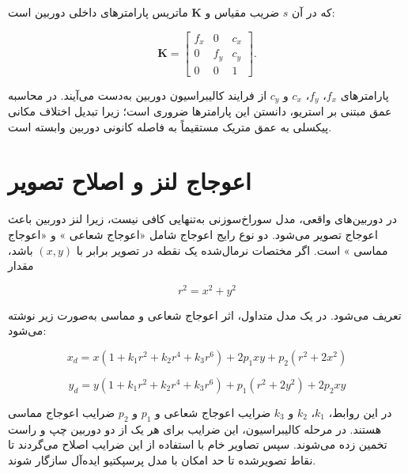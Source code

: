 که در آن \(s\) ضریب مقیاس و \(\mathbf{K}\) ماتریس پارامترهای داخلی دوربین است:

\begin{equation}
	\mathbf{K} =
	\begin{bmatrix}
		f_x & 0 & c_x \\
		0 & f_y & c_y \\
		0 & 0 & 1
	\end{bmatrix}.
	\label{eq:camera_intrinsic_matrix}
\end{equation}

پارامترهای \(f_x\)، \(f_y\)، \(c_x\) و \(c_y\) از فرایند کالیبراسیون دوربین به‌دست می‌آیند. در محاسبه عمق مبتنی بر استریو، دانستن این پارامترها ضروری است؛ زیرا تبدیل اختلاف مکانی پیکسلی به عمق متریک مستقیماً به فاصله کانونی دوربین وابسته است.

\section{اعوجاج لنز و اصلاح تصویر}

در دوربین‌های واقعی، مدل سوراخ‌سوزنی به‌تنهایی کافی نیست، زیرا لنز دوربین باعث اعوجاج تصویر می‌شود. دو نوع رایج اعوجاج شامل «اعوجاج شعاعی%
» %
و «اعوجاج مماسی%
» %
است. اگر مختصات نرمال‌شده یک نقطه در تصویر برابر با \((x,y)\) باشد، مقدار

\begin{equation}
	r^2 = x^2 + y^2
\end{equation}

تعریف می‌شود. در یک مدل متداول، اثر اعوجاج شعاعی و مماسی به‌صورت زیر نوشته می‌شود:

\begin{equation}
	x_d =
	x(1+k_1 r^2+k_2 r^4+k_3 r^6)
	+
	2p_1xy
	+
	p_2(r^2+2x^2)
	\label{eq:distorted_x}
\end{equation}

\begin{equation}
	y_d =
	y(1+k_1 r^2+k_2 r^4+k_3 r^6)
	+
	p_1(r^2+2y^2)
	+
	2p_2xy
	\label{eq:distorted_y}
\end{equation}

در این روابط، \(k_1\)، \(k_2\) و \(k_3\) ضرایب اعوجاج شعاعی و \(p_1\) و \(p_2\) ضرایب اعوجاج مماسی هستند. در مرحله کالیبراسیون، این ضرایب برای هر یک از دو دوربین چپ و راست تخمین زده می‌شوند. سپس تصاویر خام با استفاده از این ضرایب اصلاح می‌گردند تا نقاط تصویرشده تا حد امکان با مدل پرسپکتیو ایده‌آل سازگار شوند.

